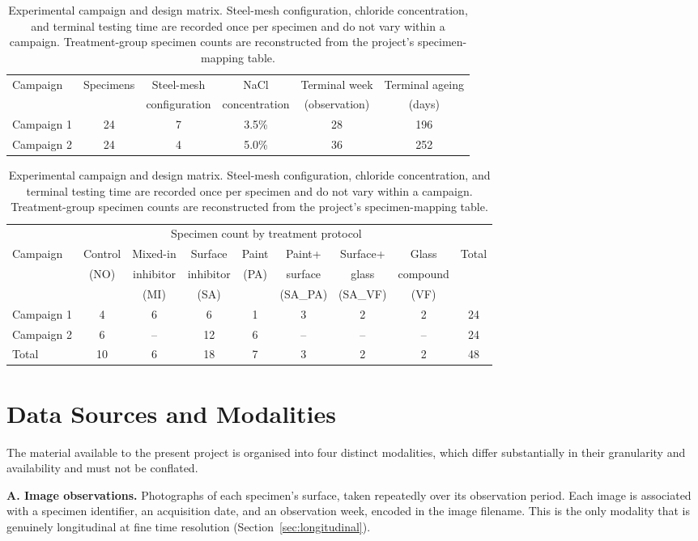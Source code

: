 \begin{table}[htbp]
\centering
\caption{Experimental campaign and design matrix. Steel-mesh configuration,
chloride concentration, and terminal testing time are recorded once per
specimen and do not vary within a campaign. Treatment-group specimen
counts are reconstructed from the project's specimen-mapping table.}
\label{tab:campaign-design}
\begin{tabular}{lccccc}
\toprule
Campaign & Specimens & Steel-mesh & NaCl & Terminal week & Terminal ageing \\
 & & configuration & concentration & (observation) & (days) \\
\midrule
Campaign 1 & 24 & 7 & 3.5\% & 28 & 196 \\
Campaign 2 & 24 & 4 & 5.0\% & 36 & 252 \\
\bottomrule
\end{tabular}

\vspace{2mm}
\footnotesize
\setlength{\tabcolsep}{3.5pt}
\begin{tabular}{lcccccccc}
\toprule
& \multicolumn{7}{c}{Specimen count by treatment protocol} & \\
\cmidrule(lr){2-8}
Campaign & Control & Mixed-in & Surface & Paint & Paint+ & Surface+ & Glass & Total \\
 & (NO) & inhibitor & inhibitor & (PA) & surface & glass & compound & \\
 & & (MI) & (SA) & & (SA\_PA) & (SA\_VF) & (VF) & \\
\midrule
Campaign 1 & 4 & 6 & 6 & 1 & 3 & 2 & 2 & 24 \\
Campaign 2 & 6 & -- & 12 & 6 & -- & -- & -- & 24 \\
\midrule
Total & 10 & 6 & 18 & 7 & 3 & 2 & 2 & 48 \\
\bottomrule
\end{tabular}
\normalsize
\end{table}

\section{Data Sources and Modalities}
\label{sec:data-modalities}

The material available to the present project is organised into four
distinct modalities, which differ substantially in their granularity and
availability and must not be conflated.

\textbf{A. Image observations.} Photographs of each specimen's surface,
taken repeatedly over its observation period. Each image is associated
with a specimen identifier, an acquisition date, and an observation week,
encoded in the image filename. This is the only modality that is
genuinely longitudinal at fine time resolution (Section~\ref{sec:longitudinal}).


